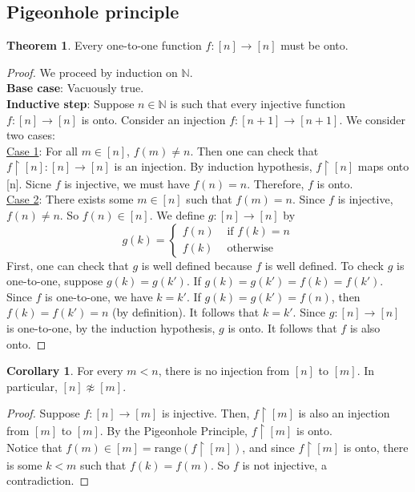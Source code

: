 \documentclass[14pt]{article}
\theoremstyle{definition}
\newtheorem{theorem}[definition]{Theorem}
\newtheorem{coro}[definition]{Corollary}
\newcommand{\fun}[3]{#1\colon #2\rightarrow#3}
\newcommand{\bb}[1]{\mathbb{#1}}
\newcommand{\restrict}{\upharpoonright}
\begin{document}
\vspace{5mm}

\subsection{Pigeonhole principle}
\begin{theorem}
    Every one-to-one function $\fun{f}{[n]}{[n]}$ must be onto.
\end{theorem}

\begin{proof}
    We proceed by induction on $\bb{N}$.\\
    \textbf{Base case}: Vacuously true.\\
    \textbf{Inductive step}:  Suppose $n\in \bb{N}$ is such that every injective function 
    $\fun{f}{[n]}{[n]}$ is onto. Consider an injection $\fun{f}{[n+1]}{[n+1]}$. We consider two cases:\\
    \underline{Case 1}: For all $m\in [n]$, $f(m)\not=n$. Then one can check that $\fun{f\restrict[n]}{[n]}{[n]}$
     is an injection. By induction hypothesis, $f\restrict [n]$ maps onto [n]. Sicne $f$ is injective, 
     we must have $f(n)=n$. Therefore, $f$ is onto.\\
     \underline{Case 2}: There exists some $m\in [n]$ such that $f(m)=n$. Since $f$ is injective,
     $f(n)\not=n $. So $f(n)\in [n]$. We define $\fun{g}{[n]}{[n]}$ by
     \begin{equation*}
        g(k)=
        \begin{cases}
            f(n) & \text{ if } f(k)=n\\
            f(k) & \text{ otherwise }
        \end{cases}
     \end{equation*}
    First, one can check that $g$ is well defined because $f$ is well defined. To check $g$ is one-to-one, 
    suppose $g(k)=g(k')$. If $g(k)=g(k')=f(k)=f(k')$. Since $f$ is one-to-one, we have $k=k'$.
    If $g(k)=g(k')=f(n)$, then  $f(k)=f(k')=n$ (by definition). It follows that $k=k'$. Since $\fun{g}{[n]}{[n]}$ is one-to-one, by the induction hypothesis, $g$ is onto. 
    It follows that $f$ is also onto.
\end{proof}

\vspace{2mm}

\begin{coro}
    For every $m<n$, there is no injection from $[n]$ to $[m]$. In particular, $[n]\not\approx[m]$.
\end{coro}
\begin{proof}
    Suppose $\fun{f}{[n]}{[m]}$ is injective. Then, $f\restrict [m]$ is also an injection
    from $[m]$ to $[m]$. By the Pigeonhole Principle, $f\restrict [m]$ is onto. \\
    Notice that $f(m)\in [m]=\mathrm{range}(f\restrict[m])$, and since $f\restrict [m]$ is onto, there is some $k<m$ such that 
    $f(k)=f(m)$. So $f$ is not injective, a contradiction.

\end{proof}
\end{document}
